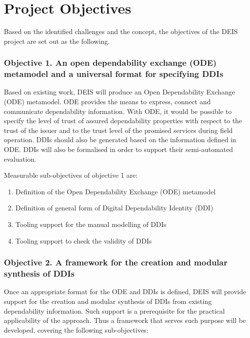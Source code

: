 \section{Project Objectives}
\label{section4}
Based on the identified challenges and the concept, the objectives of the DEIS project are set out as the following.

\subsubsection{Objective 1. An open dependability exchange (ODE) metamodel and a universal format for specifying DDIs} 
Based on existing work, DEIS will produce an Open Dependability Exchange (ODE) metamodel. ODE provides the means to express, connect and communicate dependability information.  
With ODE, it would be possible to specify the level of trust of assured dependability properties with respect to the trust of the issuer and to the trust level of the promised services during field operation. DDIs should also be generated based on the information defined in ODE. 
DDIs will also be formalised in order to support their semi-automated evaluation.

Measurable sub-objectives of objective 1 are:
\begin{enumerate}
	\item Definition of the Open Dependability Exchange (ODE) metamodel
	\item Definition of general form of Digital Dependability Identity (DDI)
	\item Tooling support for the manual modelling of DDIs
	\item Tooling support to check the validity of DDIs
\end{enumerate}

\subsubsection{Objective 2. A framework for the creation and modular synthesis of DDIs}
Once an appropriate format for the ODE and DDIs is defined, DEIS will provide support for the creation and modular synthesis of DDIs from existing dependability information. Such support is a prerequisite for the practical applicability of the approach. Thus a framework that serves such purpose will be developed, covering the following sub-objectives:

